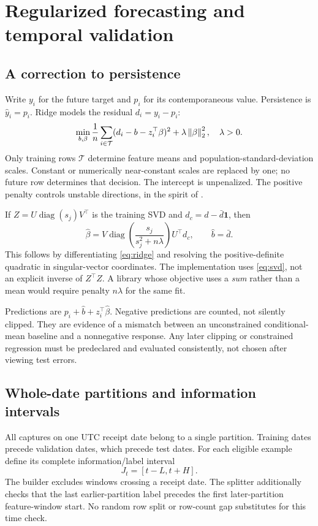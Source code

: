 \section{Regularized forecasting and temporal validation}
\subsection{A correction to persistence}
Write $y_i$ for the future target and $p_i$ for its contemporaneous value. Persistence is $\widehat y_i=p_i$. Ridge models the residual $d_i=y_i-p_i$:
\begin{equation}
 \min_{b,\beta}\frac1n\sum_{i\in\mathcal T}(d_i-b-z_i^\top\beta)^2
              +\lambda\left\lVert\beta\right\rVert_2^2,\quad\lambda>0.\label{eq:ridge}
\end{equation}
Only training rows $\mathcal T$ determine feature means and population-standard-deviation scales. Constant or numerically near-constant scales are replaced by one; no future row determines that decision. The intercept is unpenalized. The positive penalty controls unstable directions, in the spirit of \citet{hoerl1970}.

If $Z=U\operatorname{diag}(s_j)V^\top$ is the training SVD and $d_c=d-\bar d\mathbf1$, then
\begin{equation}
 \widehat\beta=V\operatorname{diag}\left(\frac{s_j}{s_j^2+n\lambda}\right)U^\top d_c,
 \qquad \widehat b=\bar d.\label{eq:svd}
\end{equation}
This follows by differentiating \eqref{eq:ridge} and resolving the positive-definite quadratic in singular-vector coordinates. The implementation uses \eqref{eq:svd}, not an explicit inverse of $Z^\top Z$. A library whose objective uses a \emph{sum} rather than a mean would require penalty $n\lambda$ for the same fit.

Predictions are $p_i+\widehat b+z_i^\top\widehat\beta$. Negative predictions are counted, not silently clipped. They are evidence of a mismatch between an unconstrained conditional-mean baseline and a nonnegative response. Any later clipping or constrained regression must be predeclared and evaluated consistently, not chosen after viewing test errors.

\subsection{Whole-date partitions and information intervals}
All captures on one UTC receipt date belong to a single partition. Training dates precede validation dates, which precede test dates. For each eligible example define its complete information/label interval
\[
 J_t=[t-L,t+H].
\]
The builder excludes windows crossing a receipt date. The splitter additionally checks that the last earlier-partition label precedes the first later-partition feature-window start. No random row split or row-count gap substitutes for this time check.

